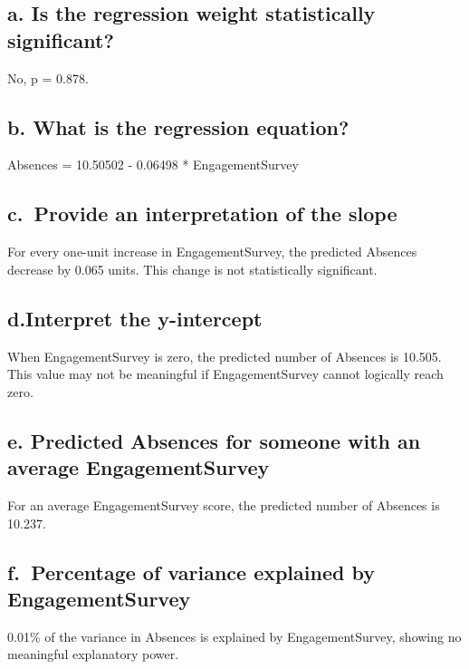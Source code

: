 \documentclass[
]{article}
\begin{document}
\subsection{a. Is the regression weight statistically
significant?}\label{a.-is-the-regression-weight-statistically-significant-1}

No, p = 0.878.

\subsection{b. What is the regression
equation?}\label{b.-what-is-the-regression-equation-1}

Absences = 10.50502 - 0.06498 * EngagementSurvey

\subsection{c.~Provide an interpretation of the
slope}\label{c.-provide-an-interpretation-of-the-slope}

For every one-unit increase in EngagementSurvey, the predicted Absences
decrease by 0.065 units. This change is not statistically significant.

\subsection{d.Interpret the
y-intercept}\label{d.interpret-the-y-intercept}

When EngagementSurvey is zero, the predicted number of Absences is
10.505. This value may not be meaningful if EngagementSurvey cannot
logically reach zero.

\subsection{e. Predicted Absences for someone with an average
EngagementSurvey}\label{e.-predicted-absences-for-someone-with-an-average-engagementsurvey}

For an average EngagementSurvey score, the predicted number of Absences
is 10.237.

\subsection{f.~Percentage of variance explained by
EngagementSurvey}\label{f.-percentage-of-variance-explained-by-engagementsurvey}

0.01\% of the variance in Absences is explained by EngagementSurvey,
showing no meaningful explanatory power.
\end{document}
